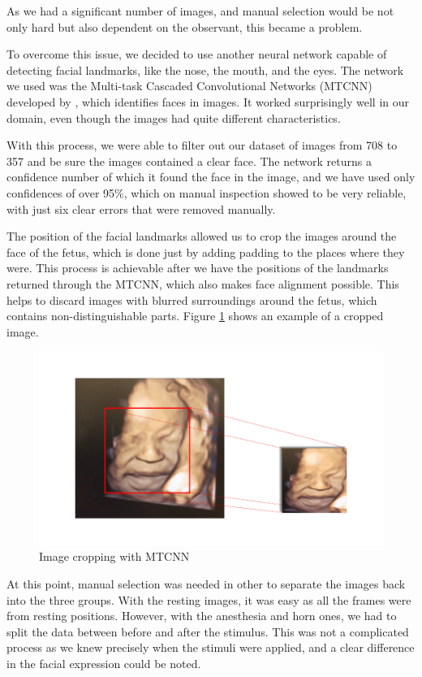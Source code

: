 As we had a significant number of images, and manual selection would be not only hard but also dependent on the observant, this became a problem.

To overcome this issue, we decided to use another neural network capable of detecting facial landmarks, like the nose, the mouth, and the eyes. The network we used was the Multi-task Cascaded Convolutional Networks (MTCNN) developed by \cite{ZhangZL016}, which identifies faces in images. It worked surprisingly well in our domain, even though the images had quite different characteristics.

With this process, we were able to filter out our dataset of images from 708 to 357 and be sure the images contained a clear face. The network returns a confidence number of which it found the face in the image, and we have used only confidences of over 95\%, which on manual inspection showed to be very reliable, with just six clear errors that were removed manually.

The position of the facial landmarks allowed us to crop the images around the face of the fetus, which is done just by adding padding to the places where they were. This process is achievable after we have the positions of the landmarks returned through the MTCNN, which also makes face alignment possible. This helps to discard images with blurred surroundings around the fetus, which contains non-distinguishable parts.  Figure \ref{fig:cropping} shows an example of a cropped image.

\begin{figure}[h!tp]
    \centering
    \includegraphics[width=.9\textwidth]{imgs/chap3_cropping.png}
    \caption{Image cropping with MTCNN}
    \label{fig:cropping}
\end{figure}

At this point, manual selection was needed in other to separate the images back into the three groups. With the resting images, it was easy as all the frames were from resting positions. However, with the anesthesia and horn ones, we had to split the data between before and after the stimulus. This was not a complicated process as we knew precisely when the stimuli were applied, and a clear difference in the facial expression could be noted.


